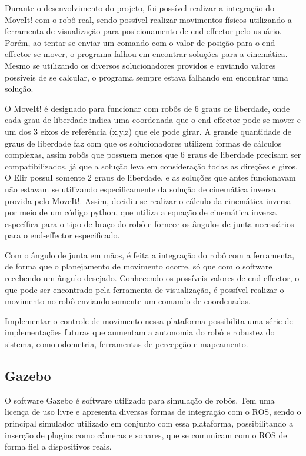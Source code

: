 Durante o desenvolvimento do projeto, foi possível realizar a integração do MoveIt! com o robô real, sendo possível realizar movimentos físicos utilizando a ferramenta de visualização para posicionamento de end-effector pelo usuário. Porém, ao tentar se enviar um comando com o valor de posição para o end-effector se mover, o programa falhou em encontrar soluções para a cinemática. Mesmo se utilizando os diversos solucionadores providos e enviando valores possíveis de se calcular, o programa sempre estava falhando em encontrar uma solução.

O MoveIt! é designado para funcionar com robôs de 6 graus de liberdade, onde cada grau de liberdade indica uma coordenada que o end-effector pode se mover e um dos 3 eixos de referência (x,y,z) que ele pode girar. A grande quantidade de graus de liberdade faz com que os solucionadores utilizem formas de cálculos complexas, assim robôs que possuem menos que 6 graus de liberdade precisam ser compatibilizados, já que a solução leva em consideração todas as direções e giros. O Elir possuI somente 2 graus de liberdade, e as soluções que antes funcionavam não estavam se utilizando especificamente da solução de cinemática inversa provida pelo MoveIt!. Assim, decidiu-se realizar o cálculo da cinemática inversa por meio de um código python, que utiliza a equação de cinemática inversa específica para o tipo de braço do robô e fornece os ângulos de junta necessários para o end-effector especificado. 

Com o ângulo de junta em mãos, é feita a integração do robô com a ferramenta, de forma que o planejamento de movimento ocorre, só que com o software recebendo um ângulo desejado. Conhecendo os possíveis valores de end-effector, o que pode ser encontrado pela ferramenta de visualização, é possível realizar o movimento no robô enviando somente um comando de coordenadas.

Implementar o controle de movimento nessa plataforma possibilita uma série de implementações futuras que aumentam a autonomia do robô e robustez do sistema, como odometria, ferramentas de percepção e mapeamento.

\subsection{Gazebo}
O software Gazebo é software utilizado para simulação de robôs. Tem uma licença de uso livre e apresenta diversas formas de integração com o ROS, sendo o principal simulador utilizado em conjunto com essa plataforma, possibilitando a inserção de plugins como câmeras e sonares, que se comunicam com o ROS de forma fiel a dispositivos reais.

